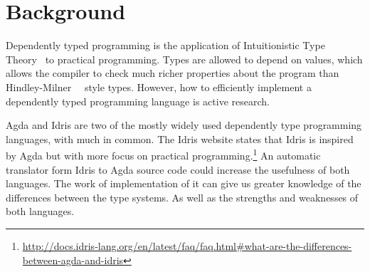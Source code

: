 \documentclass[parskip=half]{scrartcl}
\begin{document}




\section{Background}

Dependently typed programming is the application of
Intuitionistic Type Theory~\cite{martinlof} to practical programming.
Types are allowed to depend on values, which allows the compiler to check much
richer properties about the program than Hindley-Milner~\cite{hindley}~\cite{milner}
style types. However, how to efficiently implement a dependently typed
programming language is active research.

Agda and Idris are two of the mostly widely used dependently type programming
languages, with much in common. The Idris website states that Idris is inspired
by Agda but with more focus on practical
programming.\footnote{\url{http://docs.idris-lang.org/en/latest/faq/faq.html\#what-are-the-differences-between-agda-and-idris}}
An automatic translator form Idris to Agda source code could increase the
usefulness of both languages. The work of implementation of it can give us
greater knowledge of the differences between the type systems. As well as the
strengths and weaknesses of both languages.
\end{document}
